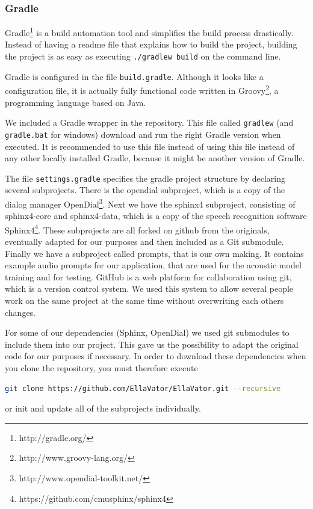 \documentclass[a4paper, 12pt]{article}
\begin{document}
\subsubsection{Gradle}
Gradle\footnote{http://gradle.org/} is a build automation tool and simplifies the build process drastically.
Instead of having a readme file that explains how to build the project, building the project is as easy as executing \texttt{./gradlew build} on the command line.

Gradle is configured in the file \texttt{build.gradle}.
Although it looks like a configuration file, it is actually fully functional code written in Groovy\footnote{http://www.groovy-lang.org/}, a programming language based on Java.

We included a Gradle wrapper in the repository.
This file called \texttt{gradlew} (and \texttt{gradle.bat} for windows) download and run the right Gradle version when executed.
It is recommended to use this file instead of using this file instead of any other locally installed Gradle, because it might be another version of Gradle.

The file \texttt{settings.gradle} specifies the gradle project structure by declaring several subprojects.
There is the opendial subproject, which is a copy of the dialog manager OpenDial\footnote{http://www.opendial-toolkit.net/}.
Next we have the sphinx4 subproject, consisting of sphinx4-core and sphinx4-data, which is a copy of the speech recognition software Sphinx4\footnote{https://github.com/cmusphinx/sphinx4}.
These subprojects are all forked on github from the originals, eventually adapted for our purposes and then included as a Git submodule.
Finally we have a subproject called prompts, that is our own making.
It contains example audio prompts for our application, that are used for the acoustic model training and for testing.
GitHub is a web platform for collaboration using git, which is a version control system. 
We used this system to allow several people work on the same project at the same time without overwriting each others changes.

For some of our dependencies (Sphinx, OpenDial) we used git submodules to include them into our project. 
This gave us the possibility to adapt the original code for our purposes if necessary.
In order to download these dependencies when you clone the repository, you must therefore execute
\begin{lstlisting}[language=bash]
git clone https://github.com/EllaVator/EllaVator.git --recursive
\end{lstlisting}
or init and update all of the subprojects individually.
\end{document}
